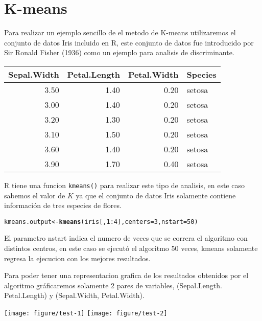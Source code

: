 \documentclass[openright, 12pt, twoside]{report}\usepackage[]{graphicx}\usepackage[]{color}
\makeatletter
\newcommand{\hlnum}[1]{\textcolor[rgb]{0.686,0.059,0.569}{#1}}%
\newcommand{\hlopt}[1]{\textcolor[rgb]{0,0,0}{#1}}%
\newcommand{\hlstd}[1]{\textcolor[rgb]{0.345,0.345,0.345}{#1}}%
\newcommand{\hlkwb}[1]{\textcolor[rgb]{0.69,0.353,0.396}{#1}}%
\newcommand{\hlkwc}[1]{\textcolor[rgb]{0.333,0.667,0.333}{#1}}%
\newcommand{\hlkwd}[1]{\textcolor[rgb]{0.737,0.353,0.396}{\textbf{#1}}}%
\newenvironment{kframe}{%
 \def\at@end@of@kframe{}%
 \ifinner\ifhmode%
  \def\at@end@of@kframe{\end{minipage}}%
  \begin{minipage}{\columnwidth}%
 \fi\fi%
 \def\FrameCommand##1{\hskip\@totalleftmargin \hskip-\fboxsep
 \colorbox{shadecolor}{##1}\hskip-\fboxsep
     \hskip-\linewidth \hskip-\@totalleftmargin \hskip\columnwidth}%
 \MakeFramed {\advance\hsize-\width
   \@totalleftmargin\z@ \linewidth\hsize
   \@setminipage}}%
 {\par\unskip\endMakeFramed%
 \at@end@of@kframe}
\newenvironment{knitrout}{}{} %
\makeatother
\begin{document}
\section{K-means}

Para realizar un ejemplo sencillo de el metodo de K-means utilizaremos el conjunto de datos Iris incluido en R, este conjunto de datos fue introducido por Sir Ronald Fisher (1936) como un ejemplo para analisis de discriminante.

\begin{tabular}{rrrl}
  \hline
Sepal.Width & Petal.Length & Petal.Width & Species \\ 
  \hline
3.50 & 1.40 & 0.20 & setosa \\ 
  3.00 & 1.40 & 0.20 & setosa \\ 
  3.20 & 1.30 & 0.20 & setosa \\ 
  3.10 & 1.50 & 0.20 & setosa \\ 
  3.60 & 1.40 & 0.20 & setosa \\ 
  3.90 & 1.70 & 0.40 & setosa \\ 
   \hline
\end{tabular}


R tiene una funcion \texttt{kmeans()} para realizar este tipo de analisis, en este caso sabemos el valor de $K$ ya que el conjunto de datos Iris solamente contiene información de tres especies de flores. 
\begin{knitrout}\small
{}\color{fgcolor}\begin{kframe}
\begin{alltt}
\hlstd{kmeans.output} \hlkwb{<-} \hlkwd{kmeans}\hlstd{(iris[,} \hlnum{1}\hlopt{:}\hlnum{4}\hlstd{],} \hlkwc{centers} \hlstd{=} \hlnum{3}\hlstd{,} \hlkwc{nstart} \hlstd{=} \hlnum{50}\hlstd{)}
\end{alltt}
\end{kframe}
\end{knitrout}
El parametro nstart indica el numero de veces que se correra el algoritmo con distintos centros, en este caso se ejecutó el algoritmo 50 veces, kmeans solamente regresa la ejecucion con los mejores resultados.

Para poder tener una representacion grafica de los resultados obtenidos por el algoritmo gráficaremos solamente 2 pares de variables, (Sepal.Length. Petal.Length) y (Sepal.Width, Petal.Width).
\begin{knitrout}\small
{}\color{fgcolor}

{\centering \texttt{[image: figure/test-1]} 
\texttt{[image: figure/test-2]} 

}



\end{knitrout}
\end{document}
